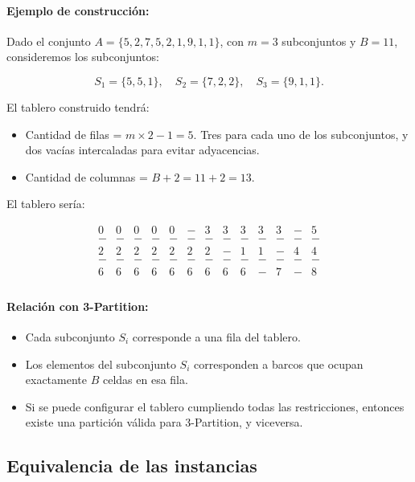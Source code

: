 \paragraph{Ejemplo de construcción:}

Dado el conjunto \(A = \{5, 2, 7, 5, 2, 1, 9, 1, 1\}\), con \(m = 3\) subconjuntos y \(B = 11\), consideremos los subconjuntos:

\[
S_1 = \{5, 5, 1\}, \quad S_2 = \{7, 2, 2\}, \quad S_3 = \{9, 1, 1\}.
\]

El tablero construido tendrá:

\begin{itemize}
    \item Cantidad de filas = \(m \times 2 - 1 = 5\). Tres para cada uno de los subconjuntos, y dos vacías intercaladas para evitar adyacencias.
    \item Cantidad de columnas = \(B + 2 = 11 + 2 = 13\).
\end{itemize}

El tablero sería:

\[
\begin{array}{ccccccccccccc}
0 & 0 & 0 & 0 & 0 & - & 3 & 3 & 3 & 3 & 3 & - & 5 \\
- & - & - & - & - & - & - & - & - & - & - & - & - \\
2 & 2 & 2 & 2 & 2 & 2 & 2 & - & 1 & 1 & - & 4 & 4 \\
- & - & - & - & - & - & - & - & - & - & - & - & - \\
6 & 6 & 6 & 6 & 6 & 6 & 6 & 6 & 6 & - & 7 & - & 8 \\
\end{array}
\]

\paragraph{Relación con 3-Partition:}
\begin{itemize}
    \item Cada subconjunto \(S_i\) corresponde a una fila del tablero.
    \item Los elementos del subconjunto \(S_i\) corresponden a barcos que ocupan exactamente \(B\) celdas en esa fila.
    \item Si se puede configurar el tablero cumpliendo todas las restricciones, entonces existe una partición válida para \(3\)-Partition, y viceversa.
\end{itemize}

\subsection*{Equivalencia de las instancias}

